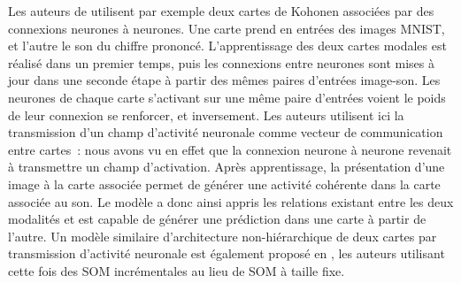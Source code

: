 \documentclass[../main]{subfiles}
\begin{document}
{Les auteurs de \cite{khacef_brain-inspired_2020} utilisent par exemple deux cartes de Kohonen associées par des connexions neurones à neurones. Une carte prend en entrées des images MNIST, et l'autre le son du chiffre prononcé. L'apprentissage des deux cartes modales est réalisé dans un premier temps, puis les connexions entre neurones sont mises à jour dans une seconde étape à partir des mêmes paires d'entrées image-son. Les neurones de chaque carte s'activant sur une même paire d'entrées voient le poids de leur connexion se renforcer, et inversement. Les auteurs utilisent ici la transmission d'un champ d'activité neuronale comme vecteur de communication entre cartes~: nous avons vu en effet que la connexion neurone à neurone revenait à transmettre un champ d'activation.
Après apprentissage, la présentation d'une image à la carte associée permet de générer une activité cohérente dans la carte associée au son. Le modèle a donc ainsi appris les relations existant entre les deux modalités et est capable de générer une prédiction dans une carte à partir de l'autre.
Un modèle similaire d'architecture non-hiérarchique de deux cartes par transmission d'activité neuronale est également proposé en \cite{jayaratne_bio-inspired_2018}, les auteurs utilisant cette fois des SOM incrémentales au lieu de SOM à taille fixe.

}
\end{document}
